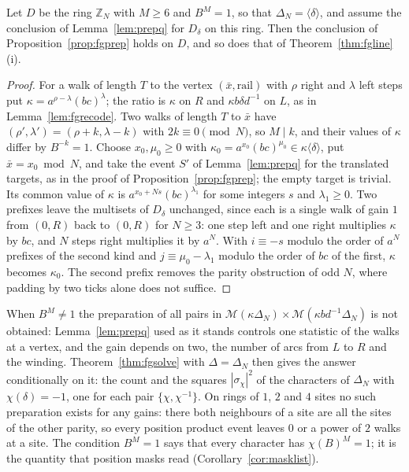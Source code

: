 \begin{proposition}\label{prop:fgprepring}
Let $D$ be the ring $\mathbb{Z}_N$ with $M\ge6$ and $B^{M}=1$, so that $\Delta_N=\langle\delta\rangle$, and assume the conclusion of Lemma~\ref{lem:prepq} for $D_\delta$ on this ring. Then the conclusion of Proposition~\ref{prop:fgprep} holds on $D$, and so does that of Theorem~\ref{thm:fgline}(i).
\end{proposition}
\begin{proof}
For a walk of length $T$ to the vertex $(\bar x,\text{rail})$ with $\rho$ right and $\lambda$ left steps put $\kappa=a^{\rho-\lambda}(bc)^{\lambda}$; the ratio is $\kappa$ on $R$ and $\kappa b\delta d^{-1}$ on $L$, as in Lemma~\ref{lem:fgrecode}. Two walks of length $T$ to $\bar x$ have $(\rho',\lambda')=(\rho+k,\lambda-k)$ with $2k\equiv0\pmod N$, so $M\mid k$, and their values of $\kappa$ differ by $B^{-k}=1$. Choose $x_0,\mu_0\ge0$ with $\kappa_0=a^{x_0}(bc)^{\mu_0}\in\kappa\langle\delta\rangle$, put $\bar x=x_0\bmod N$, and take the event $S'$ of Lemma~\ref{lem:prepq} for the translated targets, as in the proof of Proposition~\ref{prop:fgprep}; the empty target is trivial. Its common value of $\kappa$ is $a^{x_0+Ns}(bc)^{\lambda_1}$ for some integers $s$ and $\lambda_1\ge0$. Two prefixes leave the multisets of $D_\delta$ unchanged, since each is a single walk of gain $1$ from $(0,R)$ back to $(0,R)$ for $N\ge3$: one step left and one right multiplies $\kappa$ by $bc$, and $N$ steps right multiplies it by $a^{N}$. With $i\equiv-s$ modulo the order of $a^N$ prefixes of the second kind and $j\equiv\mu_0-\lambda_1$ modulo the order of $bc$ of the first, $\kappa$ becomes $\kappa_0$. The second prefix removes the parity obstruction of odd $N$, where padding by two ticks alone does not suffice.
\end{proof}

When $B^M\ne1$ the preparation of all pairs in $\mathcal{M}(\kappa\Delta_N)\times\mathcal{M}(\kappa bd^{-1}\Delta_N)$ is not obtained: Lemma~\ref{lem:prepq} used as it stands controls one statistic of the walks at a vertex, and the gain depends on two, the number of arcs from $L$ to $R$ and the winding. Theorem~\ref{thm:fgsolve} with $\Delta=\Delta_N$ then gives the answer conditionally on it: the count and the squares $|\sigma_\chi|^2$ of the characters of $\Delta_N$ with $\chi(\delta)=-1$, one for each pair $\{\chi,\chi^{-1}\}$. On rings of $1$, $2$ and $4$ sites no such preparation exists for any gains: there both neighbours of a site are all the sites of the other parity, so every position product event leaves $0$ or a power of $2$ walks at a site. The condition $B^M=1$ says that every character has $\chi(B)^M=1$; it is the quantity that position masks read (Corollary~\ref{cor:masklist}).

